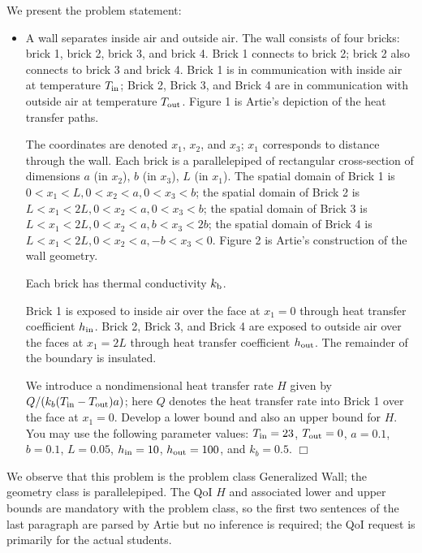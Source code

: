 \documentclass[preprint,12pt]{article}
\begin{document}
We present the problem statement:

\begin{itemize}
\item[] A wall separates inside air and outside air. The wall consists of four bricks: brick 1, brick 2, brick 3, and brick 4. Brick 1 connects to brick 2; brick 2 also connects to brick 3 and brick 4. Brick 1 is in communication with inside air at temperature $T_{\rm in}$; Brick 2, Brick 3, and Brick 4 are in communication with outside air at temperature $T_{\rm out}$. Figure 1 is Artie's depiction of the heat transfer paths.

The coordinates are denoted $x_1$, $x_2$, and $x_3$; $x_1$ corresponds to distance through the wall. Each brick is a parallelepiped of rectangular cross-section of dimensions $a$ (in $x_2$), $b$ (in $x_3$), $L$ (in $x_1$). The spatial domain of Brick 1 is $0 < x_1 < L, 0 < x_2 < a, 0 < x_3 < b$; the spatial domain of Brick 2 is $L < x_1 < 2L, 0 < x_2 < a, 0 < x_3 < b$; the spatial domain of Brick 3 is $L < x_1 < 2L, 0 < x_2 < a, b < x_3 < 2b$; the spatial domain of Brick 4 is $L < x_1 < 2L, 0 < x_2 < a, - b < x_3 < 0$.  Figure 2 is Artie's construction of the wall geometry.

Each brick has thermal conductivity $k_{\rm b}$.

Brick 1 is exposed to inside air over the face at $x_1 = 0$ through heat transfer coefficient $h_{\rm in}$. Brick 2, Brick 3, and Brick 4 are exposed to outside air over the faces at $x_1 = 2L$ through heat transfer coefficient $h_{\rm out}$. The remainder of the boundary is insulated.

We introduce a nondimensional heat transfer rate $H$ given by $Q/(k_b(T_{\rm in}-T_{\rm out})a)$; here $Q$ denotes the heat transfer rate into Brick 1 over the face at $x_1 = 0$. Develop a lower bound and also an upper bound for $H$. You may use the following parameter values: $T_{\rm in} = 23$, $T_{\rm out} = 0$, $a = 0.1$, $b = 0.1$, $L = 0.05$, $h_{\rm in} = 10$, $h_{\rm out} = 100$, and $k_b = 0.5$. $\Box$
\end{itemize}
We observe that this problem is the problem class Generalized Wall; the geometry class is parallelepiped. The QoI $H$ and associated lower and upper bounds are mandatory with the problem class, so the first two sentences of the last paragraph are parsed by Artie but no inference is required; the QoI request is primarily for the actual students.
\end{document}
